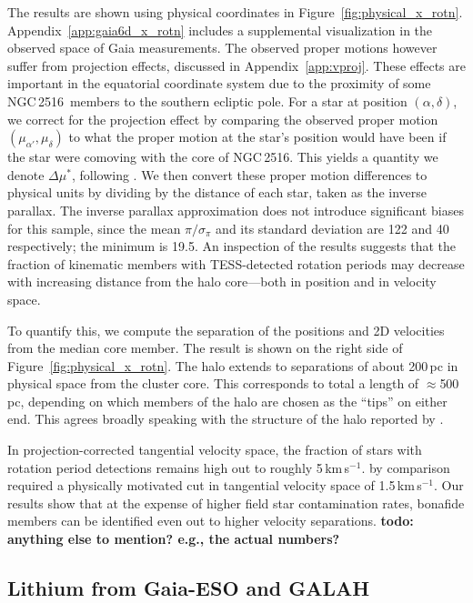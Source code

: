 \documentclass[12pt,twocolumn,tighten]{aastex63}
\newcommand{\cn}{NGC\,2516} %
\newcommand{\kms}{\,km\,s$^{-1}$}
\begin{document}
The results are shown using physical coordinates in
Figure~\ref{fig:physical_x_rotn}.  Appendix~\ref{app:gaia6d_x_rotn}
includes a supplemental visualization in the observed space of Gaia
measurements.  The observed proper motions however suffer from
projection effects, discussed in Appendix~\ref{app:vproj}.  These
effects are important in the equatorial coordinate system due to the
proximity of some \cn\ members to the southern ecliptic pole.  For a
star at position $(\alpha, \delta)$, we correct for the projection
effect by comparing the observed proper motion $(\mu_{\alpha'},
\mu_\delta)$ to what the proper motion at the star's position would
have been if the star were comoving with the core of \cn.  This yields
a quantity we denote $\Delta \mu^{*}$, following
.  We then convert these proper motion
differences to physical units by dividing by the distance of each
star, taken as the inverse parallax.  The inverse parallax
approximation does not introduce significant biases for this sample,
since the mean $\pi/\sigma_\pi$ and its standard deviation are 122 and
40 respectively; the minimum is 19.5.  An inspection of the results
suggests that the fraction of kinematic members with TESS-detected
rotation periods may decrease with increasing distance from the halo
core---both in position and in velocity space.  

To quantify this, we compute the separation of the positions and 2D
velocities from the median  core
member.  The result is shown on the right side of
Figure~\ref{fig:physical_x_rotn}.  The halo extends to separations of
about 200\,pc in physical space from the cluster core.  This
corresponds to total a length of $\approx$500\,pc, depending on which
members of the halo are chosen as the ``tips'' on either end.  This
agrees broadly speaking with the structure of the halo reported by
.

In projection-corrected tangential velocity space, the fraction of
stars with rotation period detections remains high out to roughly
5\kms.  \citet{meingast_2021} by comparison required a physically
motivated cut in tangential velocity space of 1.5\kms.  
Our results show that at the expense of higher field star
contamination rates, bonafide members can be identified even out to
higher velocity separations.
{\bf todo: anything else to mention? e.g., the actual numbers?}


\subsection{Lithium from Gaia-ESO and GALAH}
\label{subsec:lithium}
\end{document}
